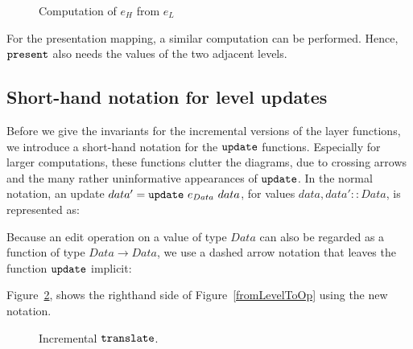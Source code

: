 \begin{figure}
\begin{small}
\begin{center}
\begin{center}
\end{center}\caption{Computation of $e_{H}$ from $e_{L}$}\label{computeOps} 
\end{center}
\end{small}
\end{figure}

For the presentation mapping, a similar computation can be performed. Hence, ${\tt present}$ also needs the values of the two adjacent levels. 


%																
\subsection{Short-hand notation for level updates}

Before we give the invariants for the incremental versions of the layer functions, we introduce a short-hand notation for the ${\tt update}$ functions. Especially for larger computations, these functions clutter the diagrams, due to crossing arrows and the many rather uninformative appearances of ${\tt update}$. In the normal notation, an update $data' = {\tt update}~e_{Data}~data$, for values 
$data, data' :: Data$, is represented as:\\


\smallskip
Because an edit operation on a value of type $Data$ can also be regarded as a function of type 
$Data \rightarrow Data$, we use a dashed arrow notation that leaves the function ${\tt update}$ implicit:\\


Figure~\ref{incrementalTranslate}, shows the righthand side of Figure~\ref{fromLevelToOp} using the new notation.

\begin{figure}
\begin{small}
\begin{center}
\begin{center}
\end{center}\caption{Incremental ${\tt translate}$.}\label{incrementalTranslate} 
\end{center}
\end{small}
\end{figure}


